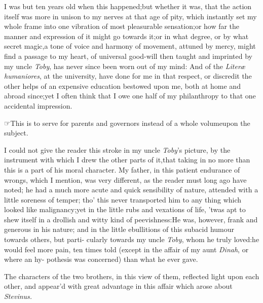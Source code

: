 \documentclass{article}
\begin{document}
I was but ten years old when this happened;\tsk but whether it was,
that the action itself was more in unison to my nerves at that age
of pity, which instantly set my whole frame into one
vibration of
most pleasurable sensation;\tsk or how far the manner and
expression of it might go towards it;\tsk or in what degree, or
by what secret magic,\tsk a tone of voice and harmony of
movement, attuned by mercy, might find a passage to my heart,
of universal good-will
then taught and imprinted by my uncle \textit{Toby}, has never since
been worn out of my mind: And 
of the \textit{Literæ humaniores}, at the university,
have done for me in that
respect, or discredit the other helps of an expensive education
bestowed upon me, both at home and abroad since;\tsk yet I often
think that I owe one half of my philanthropy to that one accidental
impression.

☞\quad This is to serve for parents and governors instead of a whole
volume\break upon the subject.\\\newpage

I could not give the reader this stroke in my uncle
\textit{Toby}’s picture, by the instrument with which I drew
the other parts of it,\tsh that taking in no more than
\break\tsh this
is a part of his moral character. My father, in this patient
endurance of wrongs, which I mention, was very different, as the
reader must long ago have noted; he had a much more acute and quick
sensibility of nature, attended with a little soreness of temper;
tho’ this ne\-ver transported him to any thing which looked
like malignancy;\tsh yet in the little rubs and vexations of
life, ’twas apt to shew itself in a drollish and witty kind of
peevishness:\tsh He was, however, frank and generous in
his nature;\break
{}
and in the little ebullitions of this sub\-acid humour towards others, but
parti-
cularly towards my uncle \textit{Toby}, whom he truly
loved:\tsh he would feel more pain, ten times told (except
in the affair of my aunt \textit{Dinah}, or where an
hy-\break 
pothesis was concerned) than what he ever gave.

The characters of the two brothers, in this view of them,
reflected light upon each other, and appear’d with great advantage
in this affair which arose about \textit{Stevinus.}
\end{document}
